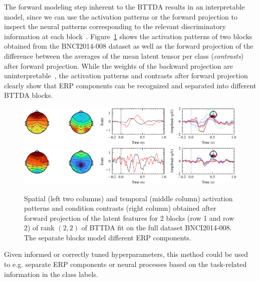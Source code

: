 \documentclass[twocolumn]{article}
\begin{document}
The forward modeling step inherent to the \textsc{BTTDA} results
in an interpretable model, since we can use the activation patterns or the
forward projection to inspect the neural patterns corresponding to the
relevant discriminatory information at each block~\cite{Haufe2014}.
Figure~\ref{fig:forward} shows the activation patterns
of two blocks obtained from the BNCI2014-008 dataset as well as the forward
projection of the difference between the averages of the mean latent tensor per
class (\emph{contrasts}) after forward projection.
While the weights of the backward projection are
uninterpretable~\cite{Haufe2014},
the activation patterns and contrasts after forward projection clearly show
that ERP components can be recognized and separated into different
\textsc{BTTDA} blocks.
\begin{figure}[t]
	\includegraphics[width=\linewidth]{figures/forward_block-0.png}
	\includegraphics[width=\linewidth]{figures/forward_block-1.png}
	\caption{Spatial (left two columns) and temporal (middle column) activation patterns and
		condition contrasts (right column) obtained after forward projection of the latent
		features for 2 blocks (row 1 and row 2) of rank $(2,2)$ of \textsc{BTTDA}
		fit on the full dataset BNCI2014-008.
		The separate blocks model different ERP
		components.}
	\label{fig:forward}
\end{figure}
Given informed or correctly tuned hyperparameters, this method could be used to
e.g. separate ERP components or neural processes based on the task-related
information in the class labels.

\end{document}
